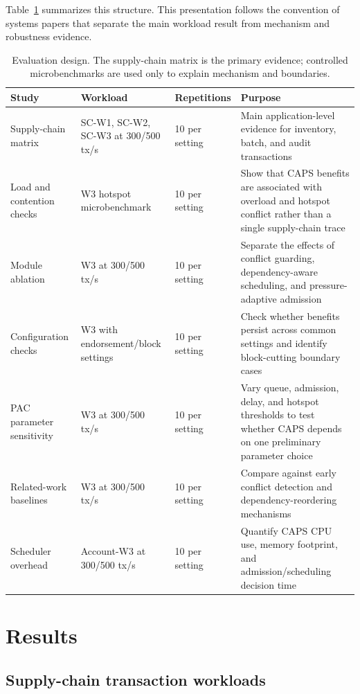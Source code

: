 \documentclass[fleqn,10pt,lineno]{wlpeerj}
\begin{document}
Table~\ref{tab:evaluation-design} summarizes this structure. This presentation follows the convention of systems papers that separate the main workload result from mechanism and robustness evidence.

\begin{table}[ht]
\centering
\small
\caption{Evaluation design. The supply-chain matrix is the primary evidence; controlled microbenchmarks are used only to explain mechanism and boundaries.}
\label{tab:evaluation-design}
\begin{tabularx}{\textwidth}{@{}p{}p{}p{}X@{}}
\toprule
Study & Workload & Repetitions & Purpose \\
\midrule
Supply-chain matrix & SC-W1, SC-W2, SC-W3 at 300/500 tx/s & 10 per setting & Main application-level evidence for inventory, batch, and audit transactions \\
Load and contention checks & W3 hotspot microbenchmark & 10 per setting & Show that CAPS benefits are associated with overload and hotspot conflict rather than a single supply-chain trace \\
Module ablation & W3 at 300/500 tx/s & 10 per setting & Separate the effects of conflict guarding, dependency-aware scheduling, and pressure-adaptive admission \\
Configuration checks & W3 with endorsement/block settings & 10 per setting & Check whether benefits persist across common settings and identify block-cutting boundary cases \\
PAC parameter sensitivity & W3 at 300/500 tx/s & 10 per setting & Vary queue, admission, delay, and hotspot thresholds to test whether CAPS depends on one preliminary parameter choice \\
Related-work baselines & W3 at 300/500 tx/s & 10 per setting & Compare against early conflict detection and dependency-reordering mechanisms \\
Scheduler overhead & Account-W3 at 300/500 tx/s & 10 per setting & Quantify CAPS CPU use, memory footprint, and admission/scheduling decision time \\
\bottomrule
\end{tabularx}
\end{table}

\section*{Results}

\subsection*{Supply-chain transaction workloads}
\end{document}
